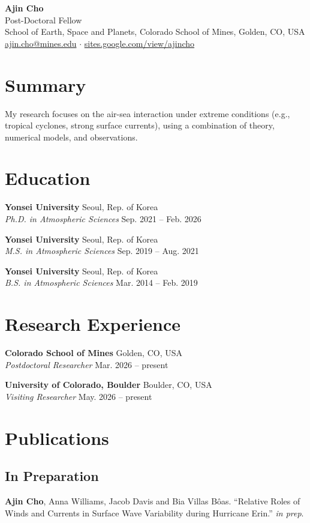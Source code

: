 \documentclass[11pt,letterpaper]{article}
\newcommand{\me}[1]{\textbf{#1}}
\newcommand{\cventry}[4]{%
  \textbf{#1} \hfill #2\\
  \textit{#3} \hfill #4\par\smallskip}
\begin{document}
\begin{center}
  {\LARGE\bfseries Ajin Cho}\\[6pt]
  Post-Doctoral Fellow\\
  School of Earth, Space and Planets, Colorado School of Mines,
  Golden, CO, USA\\[3pt]
  \href{mailto:ajin.cho@mines.edu}{ajin.cho@mines.edu}
  \quad$\cdot$\quad
  \href{https://sites.google.com/view/ajincho}{sites.google.com/view/ajincho}
\end{center}

\section{Summary}
My research focuses on the air-sea interaction under extreme conditions 
(e.g., tropical cyclones, strong surface currents), using a combination of theory, numerical models, and observations.


\section{Education}
\cventry{Yonsei University}{Seoul, Rep. of Korea}{Ph.D. in Atmospheric Sciences}{Sep. 2021 -- Feb. 2026}
\cventry{Yonsei University}{Seoul, Rep. of Korea}{M.S. in Atmospheric Sciences}{Sep. 2019 -- Aug. 2021}
\cventry{Yonsei University}{Seoul, Rep. of Korea}{B.S. in Atmospheric Sciences}{Mar. 2014 -- Feb. 2019}

\section{Research Experience}
\cventry{Colorado School of Mines}{Golden, CO, USA}{Postdoctoral Researcher}{Mar. 2026 -- present}
\cventry{University of Colorado, Boulder}{Boulder, CO, USA}{Visiting Researcher}{May. 2026 -- present}

\section{Publications}

\subsection*{In Preparation}
\begin{publist}
  \item \me{Ajin Cho}, Anna Williams, Jacob Davis and Bia Villas Bôas. 
        ``Relative Roles of Winds and Currents in Surface Wave Variability during Hurricane Erin.'' \textit{in prep}.
\end{publist}
\end{document}
